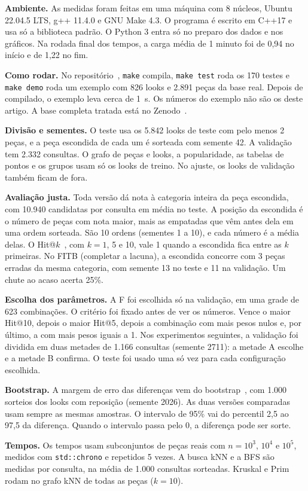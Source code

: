 \textbf{Ambiente.} As medidas foram feitas em uma máquina com 8 núcleos, Ubuntu 22.04.5 LTS, g++ 11.4.0 e GNU Make 4.3. %
O programa é escrito em C++17 e usa só a biblioteca padrão. O Python 3 entra só no preparo dos dados e nos gráficos. Na rodada final dos tempos, a carga média de 1 minuto foi de 0,94 no início e de 1,22 no fim.

\textbf{Como rodar.} No repositório~\cite{repositorio}, \texttt{make} compila, \texttt{make test} roda os 170 testes e \texttt{make demo} roda um exemplo com 826 looks e 2.891 peças da base real. Depois de compilado, o exemplo leva cerca de 1~s. Os números do exemplo não são os deste artigo. A base completa tratada está no Zenodo~\cite{zenodo}.

\textbf{Divisão e sementes.} O teste usa os 5.842 looks de teste com pelo menos 2 peças, e a peça escondida de cada um é sorteada com semente 42. A validação tem 2.332 consultas. O grafo de peças e looks, a popularidade, as tabelas de pontos e os grupos usam só os looks de treino. No ajuste, os looks de validação também ficam de fora.

\textbf{Avaliação justa.} Toda versão dá nota à categoria inteira da peça escondida, com 10.940 candidatas por consulta em média no teste. A posição da escondida é o número de peças com nota maior, mais as empatadas que vêm antes dela em uma ordem sorteada. São 10 ordens (sementes 1 a 10), e cada número é a média delas. O Hit@$k$~\cite{deshpande2004}, com $k = 1$, 5 e 10, vale 1 quando a escondida fica entre as $k$ primeiras. No FITB (completar a lacuna), a escondida concorre com 3 peças erradas da mesma categoria, com semente 13 no teste e 11 na validação. Um chute ao acaso acerta 25\%.

\textbf{Escolha dos parâmetros.} A F foi escolhida só na validação, em uma grade de 623 combinações. O critério foi fixado antes de ver os números. Vence o maior Hit@10, depois o maior Hit@5, depois a combinação com mais pesos nulos e, por último, a com mais pesos iguais a 1. Nos experimentos seguintes, a validação foi dividida em duas metades de 1.166 consultas (semente 2711): a metade A escolhe e a metade B confirma. O teste foi usado uma só vez para cada configuração escolhida.

\textbf{Bootstrap.} A margem de erro das diferenças vem do bootstrap~\cite{efron1979}, com 1.000 sorteios dos looks com reposição (semente 2026). As duas versões comparadas usam sempre as mesmas amostras. O intervalo de 95\% vai do percentil 2,5 ao 97,5 da diferença. Quando o intervalo passa pelo 0, a diferença pode ser sorte.

\textbf{Tempos.} Os tempos usam subconjuntos de peças reais com $n = 10^3$, $10^4$ e $10^5$, medidos com \texttt{std::chrono} e repetidos 5 vezes. A busca kNN e a BFS são medidas por consulta, na média de 1.000 consultas sorteadas. Kruskal e Prim~\cite{prim1957} rodam no grafo kNN de todas as peças ($k = 10$).
